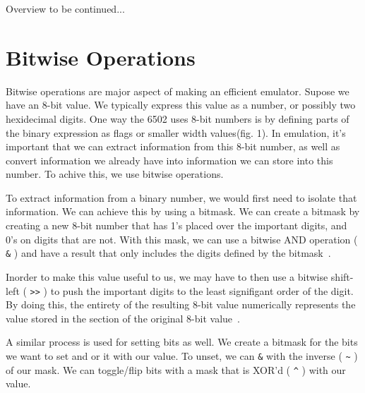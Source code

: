 \documentclass[12pt]{article}
\newcommand{\singlespace}{
  \protect\renewcommand\baselinestretch{1.0}
  \protect\normalsize
}
\begin{document}
Overview to be continued...

\section{Bitwise Operations}
\label{sec:bitwise}
Bitwise operations are major aspect of making an efficient emulator. Supose we have an 8-bit value.
We typically express this value as a number, or possibly two hexidecimal digits. One way the 6502 uses
8-bit numbers is by defining parts of the binary expression as flags or smaller width values(fig. 1).
In emulation, it's important that we can extract information from this 8-bit number, as well as convert
information we already have into information we can store into this number. To achive this, we use
bitwise operations.

To extract information from a binary number, we would first need to isolate that information. We can
achieve this by using a bitmask. We can create a bitmask by creating a new 8-bit number that has
1's placed over the important digits, and 0's on digits that are not. With this mask, we can use a
bitwise AND operation ( \lstinline{&} ) and have a result that only includes the digits defined by the bitmask~\cite{bitmasks}.

Inorder to make this value useful to us, we may have to then use a bitwise shift-left ( \lstinline{>>} ) to push
the important digits to the least signifigant order of the digit. By doing this, the entirety of the
resulting 8-bit value numerically represents the value stored in the section of the original 8-bit
value~\cite{bitmasks}.

A similar process is used for setting bits as well. We create a bitmask for the bits we want to set
and or it with our value. To unset, we can \lstinline{&} with the inverse ( \lstinline{~} ) of our mask.
We can toggle/flip bits with a mask that is XOR'd ( \lstinline{^} ) with our value.

\singlespace




\end{document}

